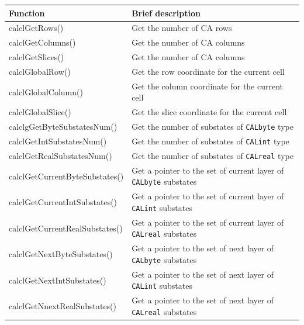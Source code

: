 \begin{table}
  \centering
  \begin{footnotesize}
  \begin{tabular}{l|l}
    \hline
    Function & Brief description\\
    \hline
    \hline
    calclGetRows()                 & Get the number of CA rows \\
    calclGetColumns()              & Get the number of CA columns \\
    calclGetSlices()               & Get the number of CA columns \\
    calclGlobalRow()               & Get the row coordinate for the current cell \\
    calclGlobalColumn()            & Get the column coordinate for the current cell \\
    calclGlobalSlice()             & Get the slice coordinate for the current cell \\
    calclgGetByteSubstatesNum()    & Get the number of substates of \verb'CALbyte' type \\
    calclGetIntSubstatesNum()      & Get the number of substates of \verb'CALint' type \\
    calclGetRealSubstatesNum()     & Get the number of substates of \verb'CALreal' type \\
    calclGetCurrentByteSubstates() & Get a pointer to the set of current layer of \verb'CALbyte' substates \\ 
    calclGetCurrentIntSubstates()  & Get a pointer to the set of current layer of \verb'CALint' substates \\ 
    calclGetCurrentRealSubstates() & Get a pointer to the set of current layer of \verb'CALreal' substates \\ 
    calclGetNextByteSubstates()    & Get a pointer to the set of next layer of \verb'CALbyte' substates \\ 
    calclGetNextIntSubstates()     & Get a pointer to the set of next layer of \verb'CALint' substates \\  
    calclGetNnextRealSubstates()   & Get a pointer to the set of next layer of \verb'CALreal' substates \\ 

\end{tabular}
\end{footnotesize}
\end{table}
